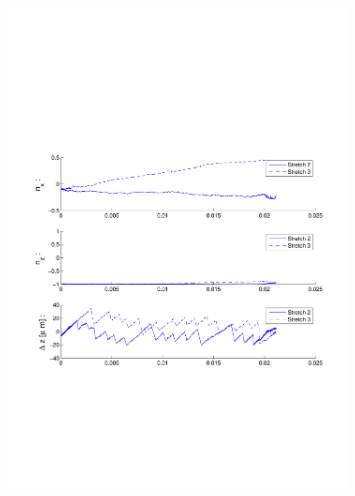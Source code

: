 \begin{figure}[ H]

\centering

\includegraphics[width=0.8\textwidth]{Images/Particle 2/Stretch2.pdf}

\end{figure}

